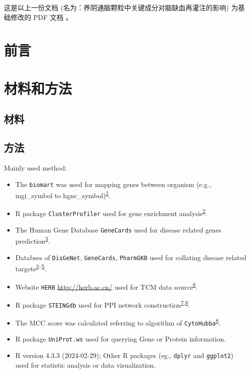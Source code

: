 \documentclass[
]{article}
\providecommand{\tightlist}{%
  \setlength{\itemsep}{0pt}\setlength{\parskip}{0pt}}
\begin{document}
这是以上一份文档 (名为：养阴通脑颗粒中关键成分对脑缺血再灌注的影响) 为基础修改的 PDF 文档 。

\hypertarget{introduction}{%
\section{前言}\label{introduction}}

\hypertarget{methods}{%
\section{材料和方法}\label{methods}}

\hypertarget{ux6750ux6599}{%
\subsection{材料}\label{ux6750ux6599}}

\hypertarget{ux65b9ux6cd5}{%
\subsection{方法}\label{ux65b9ux6cd5}}

Mainly used method:

\begin{itemize}
\tightlist
\item
  The \texttt{biomart} was used for mapping genes between organism (e.g., mgi\_symbol to hgnc\_symbol)\textsuperscript{\protect\hyperlink{ref-MappingIdentifDurinc2009}{1}}.
\item
  R package \texttt{ClusterProfiler} used for gene enrichment analysis\textsuperscript{\protect\hyperlink{ref-ClusterprofilerWuTi2021}{2}}.
\item
  The Human Gene Database \texttt{GeneCards} used for disease related genes prediction\textsuperscript{\protect\hyperlink{ref-TheGenecardsSStelze2016}{3}}.
\item
  Databses of \texttt{DisGeNet}, \texttt{GeneCards}, \texttt{PharmGKB} used for collating disease related targets\textsuperscript{\protect\hyperlink{ref-TheGenecardsSStelze2016}{3}--\protect\hyperlink{ref-PharmgkbAWorBarbar2018}{5}}.
\item
  Website \texttt{HERB} \url{http://herb.ac.cn/} used for TCM data source\textsuperscript{\protect\hyperlink{ref-HerbAHighThFang2021}{6}}.
\item
  R package \texttt{STEINGdb} used for PPI network construction\textsuperscript{\protect\hyperlink{ref-TheStringDataSzklar2021}{7},\protect\hyperlink{ref-CytohubbaIdenChin2014}{8}}.
\item
  The MCC score was calculated referring to algorithm of \texttt{CytoHubba}\textsuperscript{\protect\hyperlink{ref-CytohubbaIdenChin2014}{8}}.
\item
  R package \texttt{UniProt.ws} used for querying Gene or Protein information.
\item
  R version 4.3.3 (2024-02-29); Other R packages (eg., \texttt{dplyr} and \texttt{ggplot2}) used for statistic analysis or data visualization.
\end{itemize}
\end{document}
